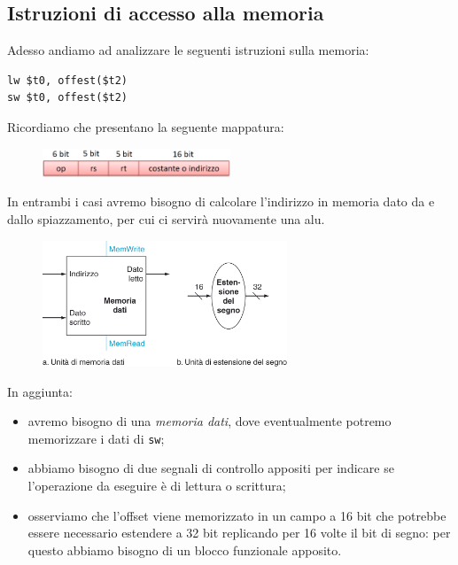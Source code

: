 \documentclass[class=book, crop=false, oneside]{standalone}
\begin{document}
\subsection{Istruzioni di accesso alla memoria}
Adesso andiamo ad analizzare le seguenti istruzioni sulla memoria:
\begin{verbatim}
lw $t0, offest($t2)
sw $t0, offest($t2)
\end{verbatim}
Ricordiamo che presentano la seguente mappatura:
\begin{figure}[H]
	\centering
	\includegraphics[width=0.5\textwidth,keepaspectratio]{I.png}
\end{figure}
In entrambi i casi avremo bisogno di calcolare l'indirizzo in memoria dato da  e dallo spiazzamento, per cui ci servirà nuovamente una \acrshort{alu}.
\begin{figure}[H]
	\centering
	\includegraphics[width=0.65\textwidth,keepaspectratio]{MemAccess.png}
\end{figure}
In aggiunta:
\begin{itemize}
	\item avremo bisogno di una \emph{memoria dati}, dove eventualmente potremo memorizzare i dati di \texttt{sw};
	\item abbiamo bisogno di due segnali di controllo appositi per indicare se l'operazione da eseguire è di lettura o scrittura;
	\item osserviamo che l'offset viene memorizzato in un campo a 16 bit che potrebbe essere necessario estendere a 32 bit replicando per 16 volte il bit di segno: per questo abbiamo bisogno di un blocco funzionale apposito.
\end{itemize}
\end{document}

